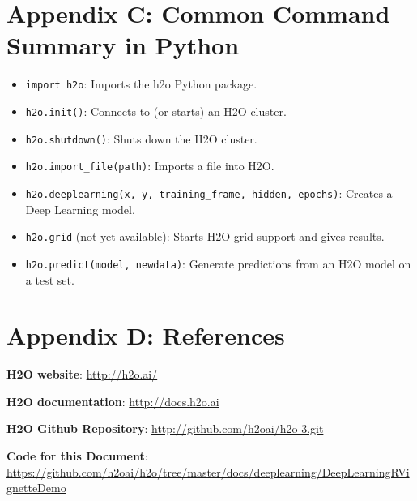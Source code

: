 \newpage

\section{Appendix C: Common Command Summary in Python}
\begin{itemize}
\item \texttt{import h2o}:  Imports the h2o Python package.

\item \texttt{h2o.init()}:  Connects to (or starts) an H2O cluster.

\item \texttt{h2o.shutdown()}: Shuts down the H2O cluster.

\item \texttt{h2o.import\_file(path)}: Imports a file into H2O.

\item \texttt{h2o.deeplearning(x, y, training\_frame, hidden, epochs)}: Creates a Deep Learning model.

\item \texttt{h2o.grid} (not yet available): Starts H2O grid support and gives results.

\item \texttt{h2o.predict(model, newdata)}: Generate predictions from an H2O model on a test set.

\end{itemize}




\newpage
\section{Appendix D: References}

\textbf{H2O website}:  {\url{http://h2o.ai/}}

\textbf{H2O documentation}:  {\url{http://docs.h2o.ai}}

\textbf{H2O Github Repository}:  {\url{http://github.com/h2oai/h2o-3.git}}



\textbf{Code for this Document}:   \\
 {\url{https://github.com/h2oai/h2o/tree/master/docs/deeplearning/DeepLearningRVignetteDemo}}

